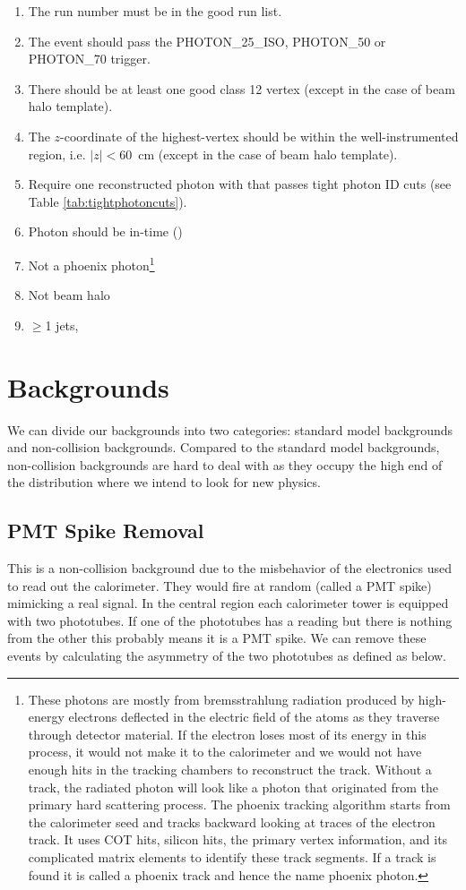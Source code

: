 \documentclass[11pt]{article}
\begin{document}
\begin{enumerate}
	\item The run number must be in the good run list.
	\item The event should pass the PHOTON\_25\_ISO, PHOTON\_50 or \mbox{PHOTON\_70} trigger. 
	\item There should be at least one good class 12 vertex (except in the case of beam halo template).
	\item The $z$-coordinate of the highest-\pt vertex should be within the well-instrumented region, i.e. \mbox{$|z|<60$~cm} (except in the case of beam halo template).
	\item Require one reconstructed photon with  that passes tight photon ID cuts (see Table \ref{tab:tightphotoncuts}). 
	\item Photon should be in-time (\intimewindow)
	\item Not a phoenix photon\footnote{These photons are mostly from bremsstrahlung radiation produced by high-energy electrons deflected in the electric field of the atoms as they traverse through detector material. If the electron loses most of its energy in this process, it would not make it to the calorimeter and we would not have enough hits in the tracking chambers to reconstruct the track. Without a track, the radiated photon will look like a photon that originated from the primary hard scattering process. The phoenix tracking algorithm starts from the calorimeter seed and tracks backward looking at traces of the electron track. It uses COT hits, silicon hits, the primary vertex information, and its complicated matrix elements to identify these track segments. If a track is found it is called a phoenix track and hence the name phoenix photon.}
	\item Not beam halo
	\item $\geq$1 jets, 
\end{enumerate}


\section{Backgrounds}
We can divide our backgrounds into two categories: standard model backgrounds and non-collision backgrounds.
Compared to the standard model backgrounds, non-collision backgrounds are hard to deal with as they  occupy the high end of the \met distribution where we intend to look for new physics.

\subsection{PMT Spike Removal}
This is a non-collision background due to the misbehavior of the electronics used to read out the calorimeter. They would fire at random (called a PMT spike) mimicking a real signal. In the central region each calorimeter tower is equipped with two phototubes. If one of the phototubes has a reading but there is nothing from the other this probably means it is a PMT spike. We can remove these events by calculating the asymmetry of the two phototubes as defined as below.
\end{document}
